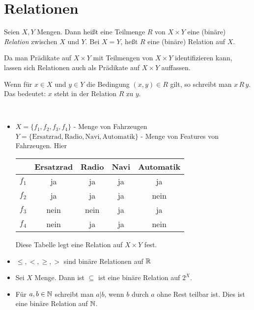 \section{Relationen}


\begin{defn}
Seien $ X,Y $ Mengen. Dann heißt eine Teilmenge $ R $ von $ X \times Y $ eine (binäre) \emph{Relation} zwischen $ X $ und $ Y $. Bei $X = Y$, heßt $R$ eine (binäre) Relation auf $X$. 
\end{defn}

\begin{bem}
	Da man Prädikate auf $X \times Y$ mit Teilmengen von $X \times Y$ identifizieren kann, lassen sich Relationen auch als Prädikate auf $X \times Y$ auffassen. 
\end{bem} 

\begin{bem}
Wenn für $ x \in X $ und $ y \in Y $ die Bedingung $ (x,y) \in R $ gilt, so schreibt man $ x \, R \, y $. Das bedeutet: $x$ steht in der Relation $R$ zu $y$. 
\end{bem}

\begin{bsp}\ %
\begin{itemize}
	\item $ X = \{f_1,f_2,f_3,f_4\} $ - Menge von Fahrzeugen\\
	$ Y =  \{ \text{Ersatzrad}, \text{Radio}, \text{Navi}, \text{Automatik} \}$ - Menge von Features von Fahrzeugen. Hier 
	\begin{center} 
	\begin{tabular}{l|c|c|c|c}
		& Ersatzrad & Radio & Navi & Automatik \\
		\hline
		$ f_1 $ & ja & ja & ja & ja \\
		$ f_2 $ & ja & ja & ja & nein \\
		$ f_3 $ & nein & nein & ja & ja \\
		$ f_4 $ & nein & ja & ja & nein
	\end{tabular}
	\end{center}  
	Diese Tabelle legt eine Relation auf $X \times Y$ fest. 
	\item $ \leq, <, \geq, > $ sind binäre Relationen auf $ \mathbb{R}$
	\item Sei $X$ Menge. Dann ist $ \subseteq $ ist eine binäre Relation auf $ 2^X $.
	\item Für $ a,b \in \mathbb{N} $ schreibt man $ a | b $, wenn $ b $ durch $ a $ ohne Rest teilbar ist. Dies ist eine binäre Relation auf $\mathbb{N}$. 
\end{itemize}
\end{bsp}


